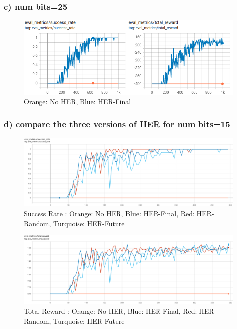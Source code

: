 \documentclass[12pt]{article}
\begin{document}
\newpage
\subsubsection*{c) num bits=25}

\begin{figure}[h!]
\centering
\includegraphics[width=1.0\linewidth]{figures/q3-c}
\vspace{-3mm}
\caption{Orange: No HER, Blue: HER-Final}
\label{fig:q3c}
\end{figure}


\subsubsection*{d) compare the three versions of HER for num bits=15}

\begin{figure}[h!]
\centering
\includegraphics[width=1.0\linewidth]{figures/q3-d-1}
\vspace{-3mm}
\caption{Success Rate : Orange: No HER, Blue: HER-Final, Red: HER-Random, Turquoise: HER-Future }
\label{fig:q3d1}
\end{figure}

\begin{figure}[h!]
\centering
\includegraphics[width=1.0\linewidth]{figures/q3-d-2}
\vspace{-3mm}
\caption{Total Reward : Orange: No HER, Blue: HER-Final, Red: HER-Random, Turquoise: HER-Future }
\label{fig:q3d2}
\end{figure}
\end{document}
